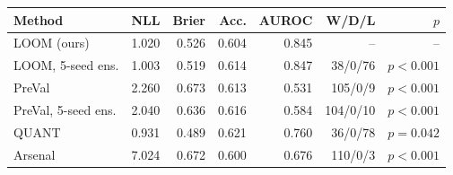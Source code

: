 \begin{tabular}{lrrrrrr}
\toprule
Method & NLL & Brier & Acc. & AUROC & W/D/L & $p$ \\
\midrule
LOOM (ours) & 1.020 & 0.526 & 0.604 & 0.845 & -- & -- \\
LOOM, 5-seed ens. & 1.003 & 0.519 & 0.614 & 0.847 & 38/0/76 & $p<0.001$ \\
PreVal & 2.260 & 0.673 & 0.613 & 0.531 & 105/0/9 & $p<0.001$ \\
PreVal, 5-seed ens. & 2.040 & 0.636 & 0.616 & 0.584 & 104/0/10 & $p<0.001$ \\
QUANT & 0.931 & 0.489 & 0.621 & 0.760 & 36/0/78 & $p=0.042$ \\
Arsenal & 7.024 & 0.672 & 0.600 & 0.676 & 110/0/3 & $p<0.001$ \\
\bottomrule
\end{tabular}
